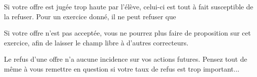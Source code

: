 ﻿Si votre offre est jugée trop haute par l’élève, celui-ci est tout à fait susceptible de la refuser. Pour un exercice donné, il ne peut refuser que %

Si votre offre n’est pas acceptée, vous ne pourrez plus faire de proposition sur cet exercice, afin de laisser le champ libre à d’autres correcteurs.

Le refus d’une offre n’a aucune incidence sur vos actions futures. Pensez tout de même à vous remettre en question si votre taux de refus est trop important...